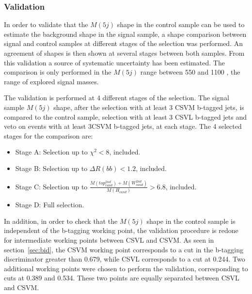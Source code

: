 \subsubsection{Validation}
\label{sec:validation}

In order to validate that the $M(5j)$ shape in the control sample can be used to estimate the background shape in the signal sample, a shape comparison between signal and control samples at different stages of the selection was performed. An agreement of shapes is then shown at several stages between both samples. From this validation a source of systematic uncertainty has been estimated. The comparison is only performed in the $M(5j)$ range between 550 and 1100 \GeVcc, the range of explored signal masses.

The validation is performed at 4 different stages of the selection. The signal sample $M(5j)$ shape, after the selection with at least 3 CSVM b-tagged jets, is compared to the control sample, selection with at least 3 CSVL b-tagged jets and veto on events with at least 3CSVM b-tagged jets, at each stage. The 4 selected stages for the comparison are:
\begin{itemize}
\item Stage A: Selection up to $\chi^{2}<8$, included.
\item Stage B: Selection up to $\Delta R(bb) <1.2$, included.
\item Stage C: Selection up to $\frac{M(top^{2nd}_{cand})+M(W^{2nd}_{cand})}{M(H_{cand})}>6.8$, included.
\item Stage D: Full selection.
\end{itemize}

In addition, in order to check that the $M(5j)$ shape in the control sample is independent of the b-tagging working point, the validation procedure is redone for intermediate working points between CSVL and CSVM. As seen in section~\ref{sec:bid}, the CSVM working point corresponds to a cut in the b-tagging discriminator greater than 0.679, while CSVL corresponds to a cut at 0.244. Two additional working points were chosen to perform the validation, corresponding to cuts at 0.389 and 0.534. These two points are equally separated between CSVL and CSVM. %

